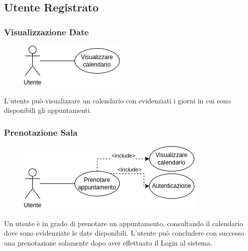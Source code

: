 \documentclass{article}
\begin{document}
\subsection{Utente Registrato}

\subsubsection{Visualizzazione Date}\label{rf_1}
\begin{description}
    
    \begin{figure}[htp]
	\centering
	\includegraphics[]{rf1.png}
	\end{figure}
    
    \item L'utente può visualizzare un calendario con evidenziati i giorni in cui sono disponibili gli appuntamenti. 
\end{description}

\subsubsection{Prenotazione Sala}\label{rf_2}
\begin{description}

	 \begin{figure}[htp]
	\centering
	\includegraphics[]{rf2.png}
	\end{figure}
	
    \item Un utente è in grado di prenotare un appuntamento, consultando il calendario dove sono evidenziate le date disponibili. L'utente può concludere con successo una prenotazione solamente dopo aver effettuato il Login al sistema.   	
\end{description}

\clearpage
\end{document}
